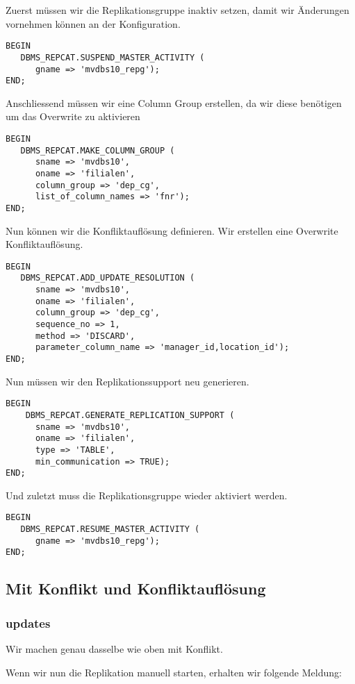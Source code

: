 \documentclass[11pt,a4paper,parskip=half]{scrartcl}
\begin{document}
Zuerst müssen wir die Replikationsgruppe inaktiv setzen, damit wir Änderungen vornehmen können an der Konfiguration.
\begin{lstlisting}
BEGIN
   DBMS_REPCAT.SUSPEND_MASTER_ACTIVITY (
      gname => 'mvdbs10_repg');
END;
\end{lstlisting}

Anschliessend müssen wir eine Column Group erstellen, da wir diese benötigen um das Overwrite zu aktivieren
\begin{lstlisting}
BEGIN
   DBMS_REPCAT.MAKE_COLUMN_GROUP (
      sname => 'mvdbs10',
      oname => 'filialen',
      column_group => 'dep_cg',
      list_of_column_names => 'fnr');
END;
\end{lstlisting}

Nun können wir die Konfliktauflösung definieren. Wir erstellen eine Overwrite Konfliktauflösung.
\begin{lstlisting}
BEGIN
   DBMS_REPCAT.ADD_UPDATE_RESOLUTION (
      sname => 'mvdbs10',
      oname => 'filialen',
      column_group => 'dep_cg',
      sequence_no => 1,
      method => 'DISCARD',
      parameter_column_name => 'manager_id,location_id');
END;
\end{lstlisting}

Nun müssen wir den Replikationssupport neu generieren.
\begin{lstlisting}
BEGIN 
    DBMS_REPCAT.GENERATE_REPLICATION_SUPPORT (
      sname => 'mvdbs10',
      oname => 'filialen', 
      type => 'TABLE',
      min_communication => TRUE); 
END;
\end{lstlisting}

Und zuletzt muss die Replikationsgruppe wieder aktiviert werden.
\begin{lstlisting}
BEGIN
   DBMS_REPCAT.RESUME_MASTER_ACTIVITY (
      gname => 'mvdbs10_repg');
END;
\end{lstlisting}

\subsection{Mit Konflikt und Konfliktauflösung}
\subsubsection{updates}
Wir machen genau dasselbe wie oben mit Konflikt.

Wenn wir nun die Replikation manuell starten, erhalten wir folgende Meldung:
\begin{lstlisting}
\end{lstlisting}
\end{document}
